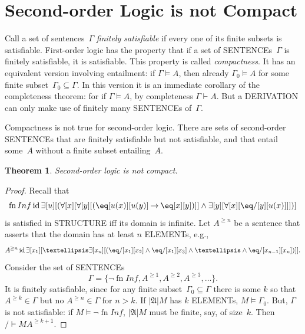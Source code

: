 \documentclass[10pt,a4paper]{article}
\newcommand*{\olup}[1]{\MakeUppercase{#1}}
\theoremstyle{plain}
\newtheorem{thm}{Theorem}[section]
\theoremstyle{definition}
\theoremstyle{remark}
\newenvironment{explain}{}{}
\newcommand*{\olfileid}[3]{}
\newcommand*{\olsection}[1]{\section*{#1}}
\newcommand*{\ollabel}[1]{\label{#1}}
\providecommand{\lif}{\mathbin{\rightarrow}}
\providecommand{\lforall}{\mathord{\forall}}
\providecommand{\lexists}{\mathord{\exists}}
\providecommand{\Proves}{\mathrel{\vdash}}
\providecommand{\Entails}{\mathrel{\models}}
\providecommand{\Domain}{\ensuremath{|\mathfrak{A}|}}
\providecommand{\Sat}[2]{\ensuremath{#1 \models #2}}
\providecommand{\ident}{\operatorname{id}}
\providecommand{\fn}{\operatorname{fn}}
\begin{document}



\olfileid{sol}{met}{com}

\olsection{Second-order Logic is not Compact}

\begin{explain}
Call a set of sentences~$\Gamma$ \emph{finitely satisfiable} if every
one of its finite subsets is satisfiable.  First-order logic has the
property that if a set of \olup{sentence}s~$\Gamma$ is finitely
satisfiable, it is satisfiable.  This property is called
\emph{compactness}.  It has an equivalent version involving
entailment: if $\Gamma \Entails A$, then already $\Gamma_0 \Entails
A$ for some finite subset~$\Gamma_0 \subseteq \Gamma$. In this
version it is an immediate corollary of the completeness theorem: for
if $\Gamma \Entails A$, by completeness $\Gamma \Proves A$. But a
\olup{derivation} can only make use of finitely many \olup{sentence}s
of~$\Gamma$.

Compactness is not true for second-order logic. There are sets of
second-order \olup{sentence}s that are finitely satisfiable but not
satisfiable, and that entail some~$A$ without a finite subset
entailing~$A$.  
\end{explain}


\begin{thm}
\ollabel{thm:sol-undecidable}
Second-order logic is not compact.
\end{thm}

\begin{proof}
Recall that 
\[
\fn{Inf} \ident \lexists[u][(\lforall[x][\lforall[y][(\eq[u(x)][u(y)]
      \lif \eq[x][y])]] \land \lexists[y][\lforall[x][\eq/[y][u(x)]]])]
\]
is satisfied in \olup{structure} iff its domain is infinite. Let
$A^{\ge n}$ be a sentence that asserts that the domain has at least
$n$ \olup{element}s, e.g.,
\[
A^{\ge n} \ident \lexists[x_1][\dots\lexists[x_n][(\eq/[x_1][x_2]
    \land \eq/[x_1][x_3] \land \dots \land \eq/[x_{n-1}][x_n])]].
\]
Consider the set of \olup{sentence}s
\[
\Gamma = \{\lnot \fn{Inf}, A^{\ge 1}, A^{\ge 2}, A^{\ge 3}, \dots\}.
\]
It is finitely satisfiable, since for any finite subset~$\Gamma_0
\subseteq \Gamma$
there is some $k$ so that $A^{\ge k} \in \Gamma$ but no $A^{\ge n}
\in \Gamma$ for $n>k$. If $\Domain{M}$ has $k$ \olup{element}s,
$\Sat{M}{\Gamma_0}$. But, $\Gamma$ is not satisfiable: if
$\Sat{M}{\lnot \fn{Inf}}$, $\Domain{M}$ must be finite, say, of
size~$k$. Then $\Sat/{M}{A^{\ge k+1}}$.
\end{proof}
\end{document}
